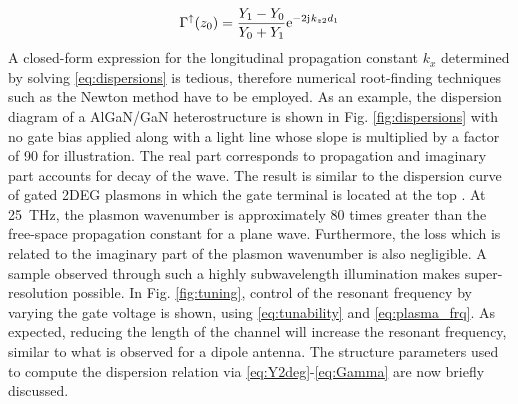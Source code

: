 %
\begin{equation}
  \Gamma^{\uparrow}(z_0) = \frac{Y_1 - Y_0}{Y_0 + Y_1} \mathrm{e}^{-2\mathrm{j}\mkern1mu k_{z2}d_1}
  \label{eq:Gamma}
\end{equation}
%
A closed-form expression for the longitudinal propagation constant $k_x$ determined by solving \eqref{eq:dispersions} is tedious, therefore numerical root-finding techniques such as the Newton method \cite{Press2007} have to be employed. As an example, the dispersion diagram of a AlGaN/GaN heterostructure is shown in Fig. \ref{fig:dispersions} with no gate bias applied along with a light line whose slope is multiplied by a factor of 90 for illustration. The real part corresponds to propagation and imaginary part accounts for decay of the wave. The result is similar to the dispersion curve of gated 2DEG plasmons in which the gate terminal is located at the top \cite{Nakayama1974, Eguiluz1975}. At \SI{25}{\THz}, the plasmon wavenumber is approximately 80 times greater than the free-space propagation constant for a plane wave. Furthermore, the loss which is related to the imaginary part of the plasmon wavenumber is also negligible. A sample observed through such a highly subwavelength illumination makes
super-resolution possible. In Fig. \ref{fig:tuning}, control of the resonant frequency by varying the gate voltage is shown, using \eqref{eq:tunability} and \eqref{eq:plasma_frq}. As expected, reducing the length of the channel will increase the resonant frequency, similar to what is observed for a dipole antenna. The structure parameters used to compute the
dispersion relation via \eqref{eq:Y2deg}-\eqref{eq:Gamma} are now briefly discussed.


